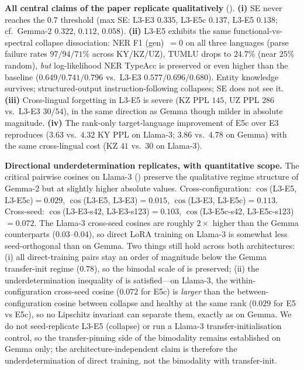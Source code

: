 \documentclass[11pt]{article}
\begin{document}
\textbf{All central claims of the paper replicate qualitatively} (). \textbf{(i)} SE never reaches the $0.7$ threshold (max SE: L3-E3 $0.335$, L3-E5c $0.137$, L3-E5 $0.138$; cf.\ Gemma-2 $0.322$, $0.112$, $0.058$). \textbf{(ii)} L3-E5 exhibits the same functional-vs-spectral collapse dissociation: NER F1 (gen)~$=0$ on all three languages (parse failure rates $97/94/71\%$ across KY/KZ/UZ), TUMLU drops to $24.7\%$ (near $25\%$ random), \emph{but} log-likelihood NER TypeAcc is preserved or even higher than the baseline ($0.649/0.741/0.796$ vs.\ L3-E3 $0.577/0.696/0.680$). Entity knowledge survives; structured-output instruction-following collapses; SE does not see it. \textbf{(iii)} Cross-lingual forgetting in L3-E5 is severe (KZ PPL $145$, UZ PPL $286$ vs.\ L3-E3 $30/54$), in the same direction as Gemma though milder in absolute magnitude. \textbf{(iv)} The rank-only target-language improvement of E5c over E3 reproduces ($3.63$ vs.\ $4.32$ KY PPL on Llama-3; $3.86$ vs.\ $4.78$ on Gemma) with the same cross-lingual cost (KZ $41$ vs.\ $30$ on Llama-3).

\textbf{Directional underdetermination replicates, with quantitative scope.} The critical pairwise cosines on Llama-3 () preserve the qualitative regime structure of Gemma-2 but at slightly higher absolute values. Cross-configuration: $\cos$(L3-E5, L3-E5c)$=0.029$, $\cos$(L3-E5, L3-E3)$=0.015$, $\cos$(L3-E3, L3-E5c)$=0.113$. Cross-seed: $\cos$(L3-E3-s42, L3-E3-s123)$=0.103$, $\cos$(L3-E5c-s42, L3-E5c-s123)$=0.072$. The Llama-3 cross-seed cosines are roughly $2\times$ higher than the Gemma counterparts ($0.03$--$0.04$), so direct LoRA training on Llama-3 is somewhat less seed-orthogonal than on Gemma. Two things still hold across both architectures: (i) all direct-training pairs stay an order of magnitude below the Gemma transfer-init regime ($0.78$), so the bimodal scale of  is preserved; (ii) the underdetermination inequality of  is satisfied---on Llama-3, the within-configuration cross-seed cosine ($0.072$ for E5c) is \emph{larger} than the between-configuration cosine between collapse and healthy at the same rank ($0.029$ for E5 vs E5c), so no Lipschitz invariant can separate them, exactly as on Gemma. We do not seed-replicate L3-E5 (collapse) or run a Llama-3 transfer-initialisation control, so the transfer-pinning side of the bimodality remains established on Gemma only; the architecture-independent claim is therefore the underdetermination of direct training, not the bimodality with transfer-init.
\end{document}
